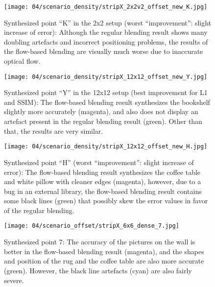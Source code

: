\begin{figure}
  \centering
  \texttt{[image: 04/scenario\_density/stripX\_2x2v2\_offset\_new\_K.jpg]}
  \caption[Viewpoint ``K'' in the 2x2 setup]{Synthesized point ``K'' in the 2x2 setup (worst ``improvement'': slight increase of error): Although the regular blending result shows many doubling artefacts and incorrect positioning problems, the results of the flow-based blending are visually much worse due to inaccurate optical flow.}
  \label{fig:dens_2x2_K}
\end{figure}

\begin{figure}
  \centering
  \texttt{[image: 04/scenario\_density/stripX\_12x12\_offset\_new\_Y.jpg]}
  \caption[Viewpoint ``Y'' in the 12x12 setup]{Synthesized point ``Y'' in the 12x12 setup (best improvement for L1 and SSIM): The flow-based blending result synthesizes the bookshelf slightly more accurately (magenta), and also does not display an artefact present in the regular blending result (green). Other than that, the results are very similar.}
  \label{fig:dens_12x12_Y}
\end{figure}

\begin{figure}
  \centering
  \texttt{[image: 04/scenario\_density/stripX\_12x12\_offset\_new\_H.jpg]}
  \caption[Viewpoint ``H'' in the 12x12 setup]{Synthesized point ``H'' (worst ``improvement'': slight increase of error): The flow-based blending result synthesizes the coffee table and white pillow with cleaner edges (magenta), however, due to a bug in an external library, the flow-based blending result contains some black lines (green) that possibly skew the error values in favor of the regular blending.}
  \label{fig:dens_12x12_H}
\end{figure}


\begin{figure}
  \centering
  \texttt{[image: 04/scenario\_offset/stripX\_6x6\_dense\_7.jpg]}
  \caption[Viewpoint 7 of 625 in the square room]{Synthesized point 7: The accuracy of the pictures on the wall is better in the flow-based blending result (magenta), and the shapes and position of the rug and the coffee table are also more accurate (green). However, the black line artefacts (cyan) are also fairly severe.}
  \label{fig:offset_7}
\end{figure}

